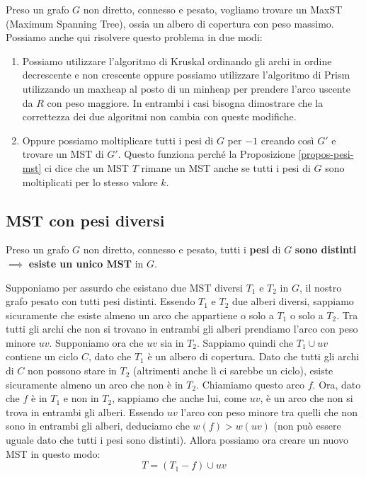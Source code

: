 \documentclass[11pt, a4paper, titlepage, oneside]{scrbook}
\begin{document}
Preso un grafo $G$ non diretto, connesso e pesato, vogliamo trovare un MaxST (Maximum Spanning Tree), ossia un albero di copertura con peso massimo. Possiamo anche qui risolvere questo problema in due modi:

\begin{enumerate}
    \item Possiamo utilizzare l'algoritmo di Kruskal ordinando gli archi in ordine decrescente e non crescente oppure possiamo utilizzare l'algoritmo di Prism utilizzando un maxheap al posto di un minheap per prendere l'arco uscente da $R$ con peso maggiore. In entrambi i casi bisogna dimostrare che la correttezza dei due algoritmi non cambia con queste modifiche.
    \item Oppure possiamo moltiplicare tutti i pesi di $G$ per $-1$ creando così $G'$ e trovare un MST di $G'$. Questo funziona perché la Proposizione \ref{propos-pesi-mst} ci dice che un MST $T$ rimane un MST anche se tutti i pesi di $G$  sono moltiplicati per lo stesso valore $k$.
\end{enumerate}

\subsection{MST con pesi diversi}

\begin{Proposizione}[]
\label{propos-mst-pesi-diversi}
Preso un grafo $G$ non diretto, connesso e pesato, tutti i \textbf{pesi} di $G$ \textbf{sono distinti} $\implies$ \textbf{esiste un unico MST} in $G$.
\end{Proposizione}

\Dimostrazione \nopagebreak

Supponiamo per assurdo che esistano due MST diversi $T_1$ e $T_2$ in $G$, il nostro grafo pesato con tutti pesi distinti. Essendo $T_1$ e $T_2$ due alberi diversi, sappiamo sicuramente che esiste almeno un arco che appartiene o solo a $T_1$ o solo a $T_2$. Tra tutti gli archi che non si trovano in entrambi gli alberi prendiamo l'arco con peso minore $uv$. Supponiamo ora che $uv$ sia in $T_2$. Sappiamo quindi che $T_1 \cup uv$ contiene un ciclo $C$, dato che $T_1$ è un albero di copertura. Dato che tutti gli archi di $C$ non possono stare in $T_2$ (altrimenti anche lì ci sarebbe un ciclo), esiste sicuramente almeno un arco che non è in $T_2$. Chiamiamo questo arco $f$. Ora, dato che $f$ è in $T_1$ e non in $T_2$, sappiamo che anche lui, come $uv$, è un arco che non si trova in entrambi gli alberi. Essendo $uv$ l'arco con peso minore tra quelli che non sono in entrambi gli alberi, deduciamo che $w(f) > w(uv)$ (non può essere uguale dato che tutti i pesi sono distinti). Allora possiamo ora creare un nuovo MST in questo modo:
\[
T = (T_1 - f) \cup uv 
\]
\end{document}
